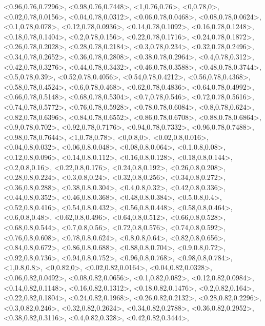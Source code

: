 \documentclass[a4paper,10pt]{article}
\begin{document}
\begin{eulernotebook}
\begin{euleroutput}
  <0.96,0.76,0.7296>,
  <0.98,0.76,0.7448>,
  <1,0.76,0.76>,
  <0,0.78,0>,
  <0.02,0.78,0.0156>,
  <0.04,0.78,0.0312>,
  <0.06,0.78,0.0468>,
  <0.08,0.78,0.0624>,
  <0.1,0.78,0.078>,
  <0.12,0.78,0.0936>,
  <0.14,0.78,0.1092>,
  <0.16,0.78,0.1248>,
  <0.18,0.78,0.1404>,
  <0.2,0.78,0.156>,
  <0.22,0.78,0.1716>,
  <0.24,0.78,0.1872>,
  <0.26,0.78,0.2028>,
  <0.28,0.78,0.2184>,
  <0.3,0.78,0.234>,
  <0.32,0.78,0.2496>,
  <0.34,0.78,0.2652>,
  <0.36,0.78,0.2808>,
  <0.38,0.78,0.2964>,
  <0.4,0.78,0.312>,
  <0.42,0.78,0.3276>,
  <0.44,0.78,0.3432>,
  <0.46,0.78,0.3588>,
  <0.48,0.78,0.3744>,
  <0.5,0.78,0.39>,
  <0.52,0.78,0.4056>,
  <0.54,0.78,0.4212>,
  <0.56,0.78,0.4368>,
  <0.58,0.78,0.4524>,
  <0.6,0.78,0.468>,
  <0.62,0.78,0.4836>,
  <0.64,0.78,0.4992>,
  <0.66,0.78,0.5148>,
  <0.68,0.78,0.5304>,
  <0.7,0.78,0.546>,
  <0.72,0.78,0.5616>,
  <0.74,0.78,0.5772>,
  <0.76,0.78,0.5928>,
  <0.78,0.78,0.6084>,
  <0.8,0.78,0.624>,
  <0.82,0.78,0.6396>,
  <0.84,0.78,0.6552>,
  <0.86,0.78,0.6708>,
  <0.88,0.78,0.6864>,
  <0.9,0.78,0.702>,
  <0.92,0.78,0.7176>,
  <0.94,0.78,0.7332>,
  <0.96,0.78,0.7488>,
  <0.98,0.78,0.7644>,
  <1,0.78,0.78>,
  <0,0.8,0>,
  <0.02,0.8,0.016>,
  <0.04,0.8,0.032>,
  <0.06,0.8,0.048>,
  <0.08,0.8,0.064>,
  <0.1,0.8,0.08>,
  <0.12,0.8,0.096>,
  <0.14,0.8,0.112>,
  <0.16,0.8,0.128>,
  <0.18,0.8,0.144>,
  <0.2,0.8,0.16>,
  <0.22,0.8,0.176>,
  <0.24,0.8,0.192>,
  <0.26,0.8,0.208>,
  <0.28,0.8,0.224>,
  <0.3,0.8,0.24>,
  <0.32,0.8,0.256>,
  <0.34,0.8,0.272>,
  <0.36,0.8,0.288>,
  <0.38,0.8,0.304>,
  <0.4,0.8,0.32>,
  <0.42,0.8,0.336>,
  <0.44,0.8,0.352>,
  <0.46,0.8,0.368>,
  <0.48,0.8,0.384>,
  <0.5,0.8,0.4>,
  <0.52,0.8,0.416>,
  <0.54,0.8,0.432>,
  <0.56,0.8,0.448>,
  <0.58,0.8,0.464>,
  <0.6,0.8,0.48>,
  <0.62,0.8,0.496>,
  <0.64,0.8,0.512>,
  <0.66,0.8,0.528>,
  <0.68,0.8,0.544>,
  <0.7,0.8,0.56>,
  <0.72,0.8,0.576>,
  <0.74,0.8,0.592>,
  <0.76,0.8,0.608>,
  <0.78,0.8,0.624>,
  <0.8,0.8,0.64>,
  <0.82,0.8,0.656>,
  <0.84,0.8,0.672>,
  <0.86,0.8,0.688>,
  <0.88,0.8,0.704>,
  <0.9,0.8,0.72>,
  <0.92,0.8,0.736>,
  <0.94,0.8,0.752>,
  <0.96,0.8,0.768>,
  <0.98,0.8,0.784>,
  <1,0.8,0.8>,
  <0,0.82,0>,
  <0.02,0.82,0.0164>,
  <0.04,0.82,0.0328>,
  <0.06,0.82,0.0492>,
  <0.08,0.82,0.0656>,
  <0.1,0.82,0.082>,
  <0.12,0.82,0.0984>,
  <0.14,0.82,0.1148>,
  <0.16,0.82,0.1312>,
  <0.18,0.82,0.1476>,
  <0.2,0.82,0.164>,
  <0.22,0.82,0.1804>,
  <0.24,0.82,0.1968>,
  <0.26,0.82,0.2132>,
  <0.28,0.82,0.2296>,
  <0.3,0.82,0.246>,
  <0.32,0.82,0.2624>,
  <0.34,0.82,0.2788>,
  <0.36,0.82,0.2952>,
  <0.38,0.82,0.3116>,
  <0.4,0.82,0.328>,
  <0.42,0.82,0.3444>,

\end{euleroutput}
\end{eulernotebook}
\end{document}
